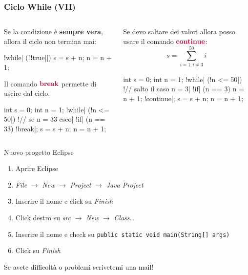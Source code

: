 \begin{frame}[fragile]\frametitle{Ciclo While (VII)}
  \begin{columns}[T]
    \begin{column}[T]{5cm}
      Se la condizione è \textbf{sempre vera}, allora il ciclo non termina mai:
      \begin{JavaCodePlain}[commandchars=\\!|]
	\Word!while| (\Green!\textbf!true||) {
	  s = s + n; 
	  n = n + 1; 
	}
      \end{JavaCodePlain}
      Il comando $\Word{\textbf{break}}$ permette di uscire dal ciclo.
      \begin{JavaCodePlain}[commandchars=\\!|]
	int s = 0;
	int n = 1;
	\Word!while| (\Green!n <= 50|) {
	  \Green!// se n = 33 esco|
	  \Word!if| (n == 33) {
	    \Word!break|;
	  }
	  s = s + n;
	  n = n + 1;
	}
      \end{JavaCodePlain}

    \end{column}
    \begin{column}[T]{5cm}
      Se devo saltare dei valori allora posso usare il comando $\Word{\textbf{continue}}$:
      \[ s = \sum_{i=1, i \neq 3}^{50} i \]
      \begin{JavaCodePlain}[commandchars=\\!|]
	int s = 0;
	int n = 1;
	\Word!while| (\Green!n <= 50|) {
	  \Green!// salto il caso n = 3|
	  \Word!if| (n == 3) {
	    n = n + 1;
	    \Word!continue|;
	  }
	  s = s + n;
	  n = n + 1;
	}
      \end{JavaCodePlain}
    \end{column}
  \end{columns}
\end{frame}

\begin{frame}{Nuovo progetto Eclipse}
  \begin{enumerate}
   \item Aprire Eclipse
   \item \emph{File} $\rightarrow$ \emph{New} $\rightarrow$ \emph{Project} $\rightarrow$ \emph{Java Project}
   \item Inserire il nome e click su \emph{Finish}
   \item Click destro su \emph{src} $\rightarrow$ \emph{New} $\rightarrow$ \emph{Class\dots}
   \item Inserire il nome e check su \newline
	  \texttt{public static void main(String[] args)}
   \item Click su \emph{Finish}
  \end{enumerate}
  Se avete difficoltà o problemi scrivetemi una mail!

\end{frame}

